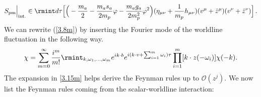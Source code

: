 \begin{align}
    \begin{split}
        S_{\textrm{pm}}\Big|_{\textrm{int.}}\in \rmint d\tau \Big[\Big(-\frac{m_a}{2}-\frac{m_a s_a}{2m_p} \varphi-\frac{m_a g_a}{2m_p^2} \varphi^2\Big)(\eta_{\mu\nu}+\frac{1}{m_p}h_{\mu\nu})(v^{\mu}+\dot z^{\mu})(v^{\nu}+\dot z^{\nu})\Big]\,.
    \end{split}
\end{align}
We can rewrite (\ref{3.8m}) by inserting the Fourier mode of the worldline fluctuation in the following way.
\begin{align}
    \begin{split}
         \chi=\sum_{m=0}^{\infty}\frac{i^m}{m!}\rmint_{k,\omega_1,...,\omega_m}e^{ik\cdot b}e^{i(k\cdot v+\sum_{i=1}^{m} \omega_{i})\tau}\prod_{i=1}^{m}[k\cdot z(-\omega_i)] \chi(-k).\label{3.15m}
    \end{split}
\end{align}
The expansion in \eqref{3.15m} helps derive the Feynman rules up to $\mathcal{O}(z^{j})$. We now list the Feynman rules coming from the scalar-worldline interaction:
\vspace{-0.4 cm}
